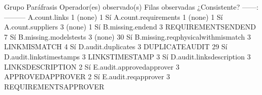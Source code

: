 {}\markdownRendererPipe{} Grupo \markdownRendererPipe{} \markdownRendererBackslash{}\markdownRendererHash{}Paráfrasis \markdownRendererPipe{} Operador(es) observado(s) \markdownRendererPipe{} Filas observadas \markdownRendererPipe{} ¿Consistente? \markdownRendererPipe{} \markdownRendererPipe{}---\markdownRendererPipe{}---:\markdownRendererPipe{}---\markdownRendererPipe{}---\markdownRendererPipe{}---\markdownRendererPipe{} \markdownRendererPipe{} A.count.links \markdownRendererPipe{} 1 \markdownRendererPipe{} (none) \markdownRendererPipe{} 1 \markdownRendererPipe{} Sí \markdownRendererPipe{} \markdownRendererPipe{} A.count.requirements \markdownRendererPipe{} 1 \markdownRendererPipe{} (none) \markdownRendererPipe{} 1 \markdownRendererPipe{} Sí \markdownRendererPipe{} \markdownRendererPipe{} A.count.suppliers \markdownRendererPipe{} 3 \markdownRendererPipe{} (none) \markdownRendererPipe{} 1 \markdownRendererPipe{} Sí \markdownRendererPipe{} \markdownRendererPipe{} B.missing.endend \markdownRendererPipe{} 3 \markdownRendererPipe{} REQUIREMENTSENDEND \markdownRendererPipe{} 7 \markdownRendererPipe{} Sí \markdownRendererPipe{} \markdownRendererPipe{} B.missing.modelstests \markdownRendererPipe{} 3 \markdownRendererPipe{} (none) \markdownRendererPipe{} 30 \markdownRendererPipe{} Sí \markdownRendererPipe{} \markdownRendererPipe{} B.missing.reqphysicalwithmismatch \markdownRendererPipe{} 3 \markdownRendererPipe{} LINKMISMATCH \markdownRendererPipe{} 4 \markdownRendererPipe{} Sí \markdownRendererPipe{} \markdownRendererPipe{} D.audit.duplicates \markdownRendererPipe{} 3 \markdownRendererPipe{} DUPLICATEAUDIT \markdownRendererPipe{} 29 \markdownRendererPipe{} Sí \markdownRendererPipe{} \markdownRendererPipe{} D.audit.linkstimestamps \markdownRendererPipe{} 3 \markdownRendererPipe{} LINKSTIMESTAMP \markdownRendererPipe{} 3 \markdownRendererPipe{} Sí \markdownRendererPipe{} \markdownRendererPipe{} D.audit.linksdescription \markdownRendererPipe{} 3 \markdownRendererPipe{} LINKSDESCRIPTION \markdownRendererPipe{} 2 \markdownRendererPipe{} Sí \markdownRendererPipe{} \markdownRendererPipe{} E.audit.approvedapprover \markdownRendererPipe{} 3 \markdownRendererPipe{} APPROVEDAPPROVER \markdownRendererPipe{} 2 \markdownRendererPipe{} Sí \markdownRendererPipe{} \markdownRendererPipe{} E.audit.reqapprover \markdownRendererPipe{} 3 \markdownRendererPipe{} REQUIREMENTSAPPROVER 